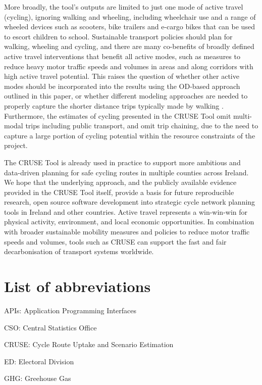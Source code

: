 \documentclass[
  super,
  preprint,
  3p]{elsarticle}
\begin{document}
More broadly, the tool's outputs are limited to just one mode of active
travel (cycling), ignoring walking and wheeling, including wheelchair
use and a range of wheeled devices such as scooters, bike trailers and
e-cargo bikes that can be used to escort children to school. Sustainable
transport policies should plan for walking, wheeling and cycling, and
there are many co-benefits of broadly defined active travel
interventions that benefit all active modes, such as measures to reduce
heavy motor traffic speeds and volumes in areas and along corridors with
high active travel potential. This raises the question of whether other
active modes should be incorporated into the results using the OD-based
approach outlined in this paper, or whether different modeling
approaches are needed to properly capture the shorter distance trips
typically made by walking \citep{cooper2018}. Furthermore, the estimates
of cycling presented in the CRUSE Tool omit multi-modal trips including
public transport, and omit trip chaining, due to the need to capture a
large portion of cycling potential within the resource constraints of
the project.

The CRUSE Tool is already used in practice to support more ambitious and
data-driven planning for safe cycling routes in multiple counties across
Ireland. We hope that the underlying approach, and the publicly
available evidence provided in the CRUSE Tool itself, provide a basis
for future reproducible research, open source software development into
strategic cycle network planning tools in Ireland and other countries.
Active travel represents a win-win-win for physical activity,
environment, and local economic opportunities. In combination with
broader sustainable mobility measures and policies to reduce motor
traffic speeds and volumes, tools such as CRUSE can support the fast and
fair decarbonisation of transport systems worldwide.

\hypertarget{list-of-abbreviations}{%
\section{List of abbreviations}\label{list-of-abbreviations}}

APIs: Application Programming Interfaces

CSO: Central Statistics Office

CRUSE: Cycle Route Uptake and Scenario Estimation

ED: Electoral Division

GHG: Greehouse Gas
\end{document}
